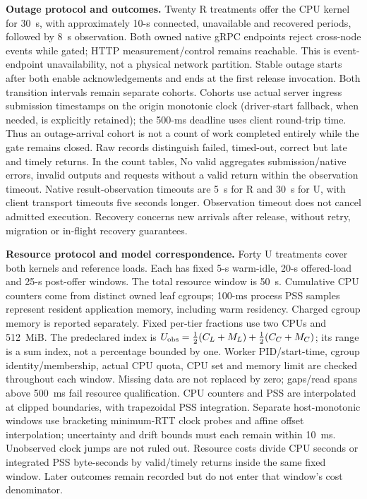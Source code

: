 \noindent\textbf{Outage protocol and outcomes.}
Twenty R treatments offer the CPU kernel for 30~s, with approximately 10-s connected, unavailable and recovered periods, followed by 8~s observation. Both owned native gRPC endpoints reject cross-node events while gated; HTTP measurement/control remains reachable. This is event-endpoint unavailability, not a physical network partition. Stable outage starts after both enable acknowledgements and ends at the first release invocation. Both transition intervals remain separate cohorts. Cohorts use actual server ingress submission timestamps on the origin monotonic clock (driver-start fallback, when needed, is explicitly retained); the 500-ms deadline uses client round-trip time. Thus an outage-arrival cohort is not a count of work completed entirely while the gate remains closed. Raw records distinguish failed, timed-out, correct but late and timely returns. In the count tables, No valid aggregates submission/native errors, invalid outputs and requests without a valid return within the observation timeout. Native result-observation timeouts are 5~s for R and 30~s for U, with client transport timeouts five seconds longer. Observation timeout does not cancel admitted execution. Recovery concerns new arrivals after release, without retry, migration or in-flight recovery guarantees.

\noindent\textbf{Resource protocol and model correspondence.}
Forty U treatments cover both kernels and reference loads. Each has fixed 5-s warm-idle, 20-s offered-load and 25-s post-offer windows. The total resource window is 50~s. Cumulative CPU counters come from distinct owned leaf cgroups; 100-ms process PSS samples represent resident application memory, including warm residency. Charged cgroup memory is reported separately. Fixed per-tier fractions use two CPUs and 512~MiB. The predeclared index is $U_{\rm obs}=\tfrac12(C_L+M_L)+\tfrac12(C_C+M_C)$; its range is a sum index, not a percentage bounded by one. Worker PID/start-time, cgroup identity/membership, actual CPU quota, CPU set and memory limit are checked throughout each window. Missing data are not replaced by zero; gaps/read spans above 500~ms fail resource qualification. CPU counters and PSS are interpolated at clipped boundaries, with trapezoidal PSS integration. Separate host-monotonic windows use bracketing minimum-RTT clock probes and affine offset interpolation; uncertainty and drift bounds must each remain within 10~ms. Unobserved clock jumps are not ruled out. Resource costs divide CPU seconds or integrated PSS byte-seconds by valid/timely returns inside the same fixed window. Later outcomes remain recorded but do not enter that window's cost denominator.

